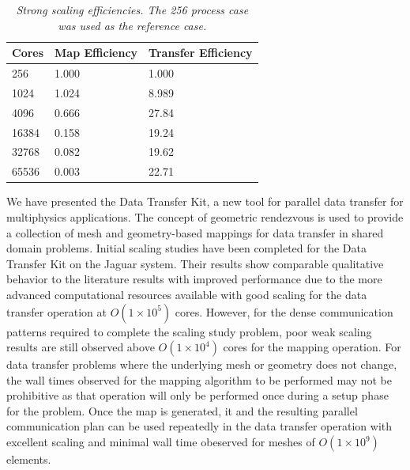 \documentclass{mc2013}
\begin{document}
\begin{table}[htpb!]
  \begin{center}
    \begin{tabular}{lll}\hline\hline
      \multicolumn{1}{c}{Cores}& 
      \multicolumn{1}{c}{Map Efficiency} & 
      \multicolumn{1}{c}{Transfer Efficiency}\\\hline\hline
      256 &	1.000 &	1.000 \\
      1024 &	1.024 &	8.989 \\
      4096 &	0.666 &	27.84 \\
      16384 &	0.158 &	19.24 \\
      32768 &	0.082 &	19.62 \\
      65536 &	0.003 &	22.71 \\
      \hline\hline
    \end{tabular}
  \end{center}
  \caption{\sl Strong scaling efficiencies. The 256 process case was used
    as the reference case.}
  \label{tab:strong_efficiency}
\end{table}


We have presented the Data Transfer Kit, a new tool for parallel data
transfer for multiphysics applications. The concept of geometric
rendezvous is used to provide a collection of mesh and geometry-based
mappings for data transfer in shared domain problems. Initial scaling
studies have been completed for the Data Transfer Kit on the Jaguar
system. Their results show comparable qualitative behavior to the
literature results with improved performance due to the more advanced
computational resources available with good scaling for the data
transfer operation at $O(1 \times 10^5)$ cores. However, for the dense
communication patterns required to complete the scaling study problem,
poor weak scaling results are still observed above $O(1 \times 10^4)$
cores for the mapping operation. For data transfer problems where the
underlying mesh or geometry does not change, the wall times observed
for the mapping algorithm to be performed may not be prohibitive as
that operation will only be performed once during a setup phase for
the problem. Once the map is generated, it and the resulting parallel
communication plan can be used repeatedly in the data transfer
operation with excellent scaling and minimal wall time obeserved for
meshes of $O(1 \times 10^9)$ elements.
\end{document}
